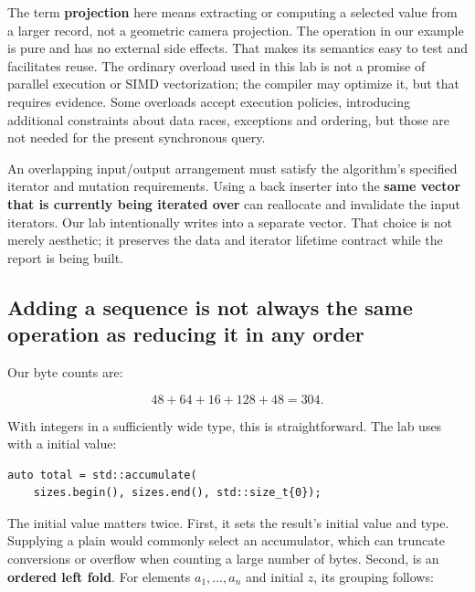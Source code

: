 The term \textbf{projection} here means extracting or computing a selected value from a larger record, not a geometric camera projection. The operation in our example is pure and has no external side effects. That makes its semantics easy to test and facilitates reuse. The ordinary  overload used in this lab is not a promise of parallel execution or SIMD vectorization; the compiler may optimize it, but that requires evidence. Some overloads accept execution policies, introducing additional constraints about data races, exceptions and ordering, but those are not needed for the present synchronous query.

An overlapping input/output arrangement must satisfy the algorithm's specified iterator and mutation requirements. Using a back inserter into the \textbf{same vector that is currently being iterated over} can reallocate and invalidate the input iterators. Our lab intentionally writes into a separate vector. That choice is not merely aesthetic; it preserves the data and iterator lifetime contract while the report is being built.

\subsection{Adding a sequence is not always the same operation as reducing it in any order}\label{05-engine-i-ch006-adding-a-sequence-is-not-always-the-same-operation-as-reducing-it-in-any-order}

\hypertarget{05-engine-i-ch006-adding-a-sequence-is-not-always-the-same-operation-as-reducing-it-in-any-order}{}

Our byte counts are:

\[
48+64+16+128+48 = 304.
\]

With integers in a sufficiently wide type, this is straightforward. The lab uses  with a  initial value:

\begin{verbatim}
auto total = std::accumulate(
    sizes.begin(), sizes.end(), std::size_t{0});
\end{verbatim}

The initial value matters twice. First, it sets the result's initial value and type. Supplying a plain  would commonly select an  accumulator, which can truncate conversions or overflow when counting a large number of bytes. Second,  is an \textbf{ordered left fold}. For elements \(a_1,\ldots,a_n\) and initial \(z\), its grouping follows:

